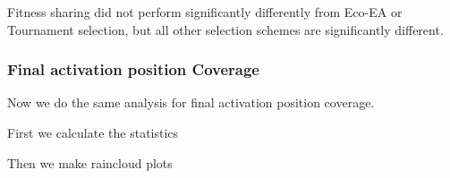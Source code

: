 \documentclass[]{book}
\newenvironment{Shaded}{\begin{snugshade}}{\end{snugshade}}
\newcommand{\CommentTok}[1]{\textcolor[rgb]{0.56,0.35,0.01}{\textit{#1}}}
\newcommand{\DataTypeTok}[1]{\textcolor[rgb]{0.13,0.29,0.53}{#1}}
\newcommand{\DecValTok}[1]{\textcolor[rgb]{0.00,0.00,0.81}{#1}}
\newcommand{\FloatTok}[1]{\textcolor[rgb]{0.00,0.00,0.81}{#1}}
\newcommand{\KeywordTok}[1]{\textcolor[rgb]{0.13,0.29,0.53}{\textbf{#1}}}
\newcommand{\NormalTok}[1]{#1}
\newcommand{\OperatorTok}[1]{\textcolor[rgb]{0.81,0.36,0.00}{\textbf{#1}}}
\newcommand{\StringTok}[1]{\textcolor[rgb]{0.31,0.60,0.02}{#1}}
\begin{document}
Fitness sharing did not perform significantly differently from Eco-EA or Tournament selection, but all other selection schemes are significantly different.

\hypertarget{final-activation-position-coverage}{%
\subsubsection{Final activation position Coverage}\label{final-activation-position-coverage}}

Now we do the same analysis for final activation position coverage.

First we calculate the statistics

\begin{Shaded}
\end{Shaded}

Then we make raincloud plots
\end{document}
